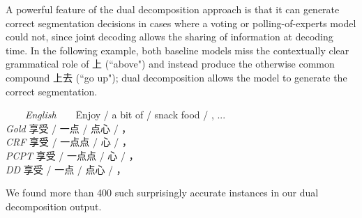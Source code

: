 A powerful feature of the dual decomposition approach is that it can generate correct segmentation decisions in cases where a voting or polling-of-experts model could not, since joint decoding allows the sharing of information at decoding time. In the following example, both baseline models miss the contextually clear grammatical role of 上 (``above") and instead produce the otherwise common compound 上去 (``go up"); dual decomposition allows the model to generate the correct segmentation.
\begin{small}
\begin{tabbing}
\ \ \ \ \= \emph{English}\ \ \ \ \= Enjoy / a bit of / snack food / , ... \\
\> \emph{Gold} \>  享受 / 一点 / 点心 /  ，\\
\> \emph{CRF} \> 享受 / 一点点 / 心 / ，\\
\> \emph{PCPT} \> 享受 / 一点点 / 心 / ， \\
\> \emph{DD} \>  享受 / 一点 / 点心 / ，\\
\end{tabbing}
\end{small}
We found more than 400 such surprisingly accurate instances in our dual decomposition output.
%
%
%

